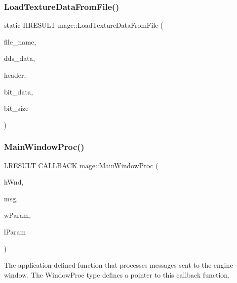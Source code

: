 \subsubsection{\texorpdfstring{Load\+Texture\+Data\+From\+File()}{LoadTextureDataFromFile()}}
{\footnotesize\ttfamily static H\+R\+E\+S\+U\+LT mage\+::\+Load\+Texture\+Data\+From\+File (\begin{DoxyParamCaption}\item[{\+\_\+\+In\+\_\+z\+\_\+ const wchar\+\_\+t $\ast$}]{file\+\_\+name,  }\item[{std\+::unique\+\_\+ptr$<$ uint8\+\_\+t\mbox{[}$\,$\mbox{]}$>$ \&}]{dds\+\_\+data,  }\item[{\hyperlink{structmage_1_1_d_d_s___h_e_a_d_e_r}{D\+D\+S\+\_\+\+H\+E\+A\+D\+ER} $\ast$$\ast$}]{header,  }\item[{uint8\+\_\+t $\ast$$\ast$}]{bit\+\_\+data,  }\item[{size\+\_\+t $\ast$}]{bit\+\_\+size }\end{DoxyParamCaption})\hspace{0.3cm}{\ttfamily [static]}}

\hypertarget{namespacemage_a7ab7652c75189226bf8299647e897c99}{}\label{namespacemage_a7ab7652c75189226bf8299647e897c99} 
\subsubsection{\texorpdfstring{Main\+Window\+Proc()}{MainWindowProc()}}
{\footnotesize\ttfamily L\+R\+E\+S\+U\+LT C\+A\+L\+L\+B\+A\+CK mage\+::\+Main\+Window\+Proc (\begin{DoxyParamCaption}\item[{H\+W\+ND}]{h\+Wnd,  }\item[{U\+I\+NT}]{msg,  }\item[{W\+P\+A\+R\+AM}]{w\+Param,  }\item[{L\+P\+A\+R\+AM}]{l\+Param }\end{DoxyParamCaption})}

The application-\/defined function that processes messages sent to the engine window. The Window\+Proc type defines a pointer to this callback function.


